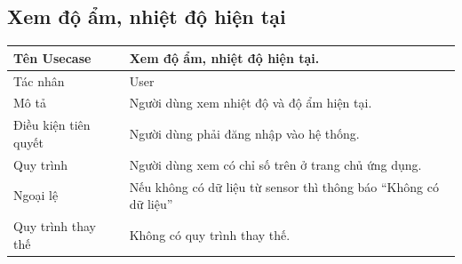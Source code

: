 \subsection{Xem độ ẩm, nhiệt độ hiện tại}
\begin{center}
	\begin{tabular}{|p{4cm}|p{10cm}|}
		\hline
		Tên Usecase & Xem độ ẩm, nhiệt độ hiện tại.\\ \hline
		Tác nhân & User \\ \hline
		Mô tả & Người dùng xem nhiệt độ và độ ẩm hiện tại.
		\\ \hline
		Điều kiện tiên quyết & Người dùng phải đăng nhập vào hệ thống. \\ \hline
		Quy trình & Người dùng xem có chỉ số trên ở trang chủ ứng dụng. \\ \hline
		Ngoại lệ & 
		Nếu không có dữ liệu từ sensor thì thông báo “Không có dữ liệu”
		\\ \hline
		Quy trình thay thế & Không có quy trình thay thế. \\ \hline
		
	\end{tabular}
\end{center}

